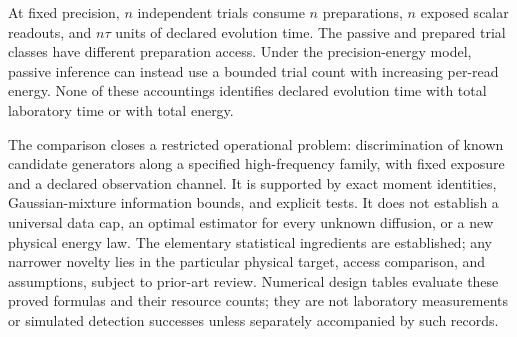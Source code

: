 At fixed precision, $n$ independent trials consume $n$ preparations,
$n$ exposed scalar readouts, and $n\tau$ units of declared evolution time.
The passive and prepared trial classes have different preparation access.
Under the precision-energy model, passive inference can instead use a
bounded trial count with increasing per-read energy. None of these
accountings identifies declared evolution time with total laboratory time
or with total energy.

The comparison closes a restricted operational problem: discrimination of
known candidate generators along a specified high-frequency family, with
fixed exposure and a declared observation channel. It is supported by exact
moment identities, Gaussian-mixture information bounds, and explicit tests.
It does not establish a universal data cap, an optimal estimator for every
unknown diffusion, or a new physical energy law. The elementary statistical
ingredients are established; any narrower novelty lies in the particular
physical target, access comparison, and assumptions, subject to prior-art
review. Numerical design tables evaluate these proved formulas and their
resource counts; they are not laboratory measurements or simulated detection
successes unless separately accompanied by such records.
